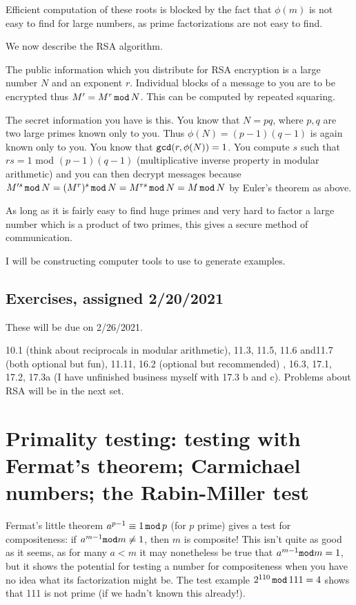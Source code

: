 \documentclass[12pt]{article}
\begin{document}
Efficient computation of these roots is blocked by the fact that $\phi(m)$ is not easy to find for large numbers, as prime factorizations are not easy to find.


We now describe the RSA algorithm.

The public information which you distribute for RSA encryption is a large number $N$ and an exponent $r$.   Individual blocks of a message to you are to be encrypted thus $M'=M^r\,{\tt mod}\,N$.   This can be computed by repeated squaring.

The secret information you have is this.   You know that $N=pq$, where $p,q$ are two large primes known only to you.   Thus $\phi(N)=(p-1)(q-1)$ is again known only to you.  You know that ${\tt gcd}(r,\phi(N))=1$.
You compute $s$ such that $rs=1$ mod $(p-1)(q-1)$ (multiplicative inverse property in modular arithmetic) and you can then decrypt messages because $M'^s\,{\tt mod}\,N = (M^r)^s \,{\tt mod}\,N=M^{rs}\,{\tt mod}\,N= M\,{\tt mod}\,N$ by Euler's theorem as above.

As long as it is fairly easy to find huge primes and very hard to factor a large number which is a product of two primes, this gives a secure method of communication.

I will be constructing computer tools to use to generate examples.
\subsection{Exercises, assigned 2/20/2021}

These will be due on 2/26/2021.

10.1 (think about reciprocals in modular arithmetic), 11.3, 11.5, 11.6 and11.7 (both optional but fun), 11.11, 16.2 (optional but recommended) , 16.3, 17.1, 17.2, 17.3a (I have unfinished business myself with 17.3 b and c).  Problems about RSA will be in the next set.

\section{Primality testing:  testing with Fermat's theorem; Carmichael numbers; the Rabin-Miller test}

Fermat's little theorem $a^{p-1}\equiv 1\,{\tt mod}\,p$ (for $p$ prime) gives a test for compositeness:  if $a^{m-1}{\tt mod}m \neq 1$, then $m$ is composite!  This isn't quite as good as it seems, as for many $a<m$ it may nonetheless be
true that $a^{m-1}{\tt mod}m = 1$, but it shows the potential for testing a number for compositeness when you have no idea what its factorization might be.   The test example $2^{110}\,{\tt mod}\,111=4$ shows that 111 is not prime (if we hadn't known this already!).
\end{document}
